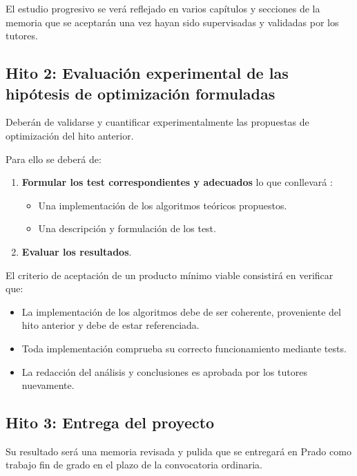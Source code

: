 El estudio progresivo se verá reflejado en varios capítulos y secciones de la memoria
que se aceptarán una vez hayan sido supervisadas y validadas por los tutores. 

\subsection*{Hito 2: Evaluación experimental de las hipótesis de optimización formuladas}

Deberán de validarse y cuantificar experimentalmente las propuestas de optimización del hito anterior. 

Para ello  se deberá de: 
\begin{enumerate}
    \item \textbf{Formular los test correspondientes y adecuados} lo que conllevará : 
    \begin{itemize}
        \item Una implementación de los algoritmos teóricos propuestos.
        \item Una descripción y formulación de los test.
    \end{itemize}

    \item \textbf{Evaluar los resultados}. 
\end{enumerate}

El criterio de aceptación de un producto mínimo viable consistirá en verificar que:
\begin{itemize}
    \item La implementación de los algoritmos debe de ser coherente, proveniente del hito anterior y debe de estar referenciada.
    \item  Toda implementación comprueba su correcto funcionamiento mediante tests.
    \item La redacción del análisis y conclusiones es aprobada por los tutores nuevamente.
\end{itemize}




\subsection*{Hito 3: Entrega del proyecto}

Su resultado será una memoria revisada y pulida que se entregará en Prado como trabajo fin de grado en el plazo de la convocatoria ordinaria. 

